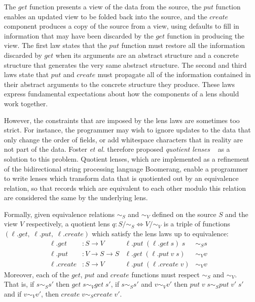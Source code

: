\documentclass{svproc}
\newcommand{\get}{\ensuremath{\mathit{get}}}
\newcommand{\lput}{\ensuremath{\mathit{put}}}
\newcommand{\create}{\ensuremath{\mathit{create}}}
\begin{document}
The $\get$ function presents a view of the data from the source, the
$\lput$ function enables an updated view to be folded back into the source, and
the $\create$ component produces a copy of the source from a view, using
defaults to fill in information that may have been discarded by the $\get$
function in producing the view. The first law states that the $\lput$ function
must restore all the information discarded by $\get$ when its arguments are an
abstract structure and a concrete structure that generates the very same
abstract structure. The second and third laws state that $\lput$ and $\create$
must propagate all of the information contained in their abstract arguments to
the concrete structure they produce. These laws express fundamental expectations
about how the components of a lens should work together.

However, the constraints that are imposed by the lens laws are sometimes too
strict. For instance, the programmer may wish to ignore updates to the data
that only change the order of fields, or add whitespace characters that in
reality are not part of the data. Foster {\em et al.\relax} therefore proposed
\textit{quotient lenses} ~\cite{quotient} as a solution to this problem.
Quotient lenses, which are implemented as a refinement of the bidirectional
string processing language Boomerang, enable a programmer to write lenses which
transform data that is quotiented out by an equivalence relation, so that
records which are equivalent to each other modulo this relation are considered
the same by the underlying lens.

Formally, given equivalence relations $\sim_S$ and $\sim_V$ defined on the
source $S$ and the view $V$ respectively, a quotient lens $q : S/{\sim_S}
\Leftrightarrow V/{\sim_V}$ is a triple of functions $(\ell.\get, \; \ell.\lput,
\; \ell.\create)$ which satisfy the lens laws up to equivalence:
\begin{align*}
\ell.get &: S \longrightarrow V & \ell.\lput \; (\ell.\get \; s) \; s &\sim_S
s\\
\ell.put &: V \longrightarrow S \longrightarrow S & \ell.\get \; (\ell.\lput \;
v \; s) &\sim_V v\\
\ell.create &: S \longrightarrow V & \ell.\lput \; (\ell.\create \; v) &\sim_V v
\end{align*}
Moreover, each of the $\get$, $\lput$ and $\create$ functions must respect
$\sim_S$ and $\sim_V$. That is, if $s \sim_S s'$ then $\get \; s \sim_V
\get \; s'$, if $s \sim_S s'$ and $v \sim_V v'$ then $\lput \; v \; s \sim_S
\lput \; v' \; s'$ and if $v \sim_V v'$, then $\create \; v \sim_S \create \;
v'$.
\end{document}
